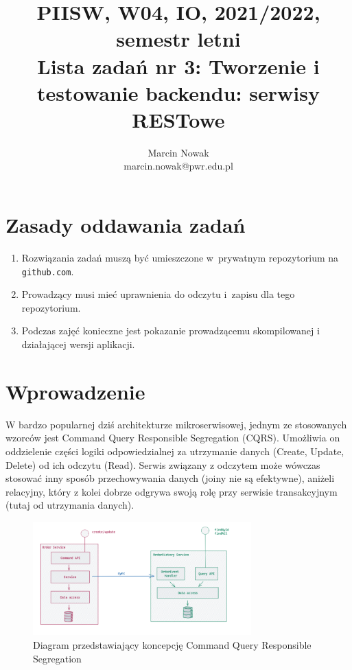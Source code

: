 \documentclass[12pt]{article}
\title{PIISW, W04, IO, 2021/2022, semestr letni\\Lista zadań nr 3: Tworzenie i testowanie backendu: serwisy RESTowe}
\author{Marcin Nowak\\ \small marcin.nowak@pwr.edu.pl}
\begin{document}
    \maketitle

    \section*{Zasady oddawania zadań}
    \begin{enumerate}
        \item Rozwiązania zadań muszą być umieszczone w~prywatnym repozytorium na \texttt{git\-hub.com}.
        \item Prowadzący musi mieć uprawnienia do odczytu i~zapisu dla tego repozytorium.
        \item Podczas zajęć konieczne jest pokazanie prowadzącemu skompilowanej i działającej wersji aplikacji.
    \end{enumerate}

    \section*{Wprowadzenie}
    W bardzo popularnej dziś architekturze mikroserwisowej, jednym ze stosowanych wzorców jest Command Query Responsible Segregation (CQRS).
    Umożliwia on oddzielenie części logiki odpowiedzialnej za utrzymanie danych (Create, Update, Delete) od ich odczytu (Read).
    Serwis związany z odczytem może wówczas stosować inny sposób przechowywania danych (joiny nie są efektywne),
    aniżeli relacyjny, który z kolei dobrze odgrywa swoją rolę przy serwisie transakcyjnym (tutaj od utrzymania danych).
    \\
    \begin{figure}[!htb]
        \centering
        \includegraphics[width=0.75\textwidth]{lista-3-cqrs-diagram.png}
        \caption{Diagram przedstawiający koncepcję Command Query Responsible Segregation}
        \label{fig:cqrs-diagram}
    \end{figure}
\end{document}
